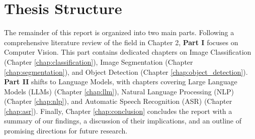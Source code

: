\documentclass[../main.tex]{subfiles}
\begin{document}
\section{Thesis Structure}
\label{sec:thesis_structure}

The remainder of this report is organized into two main parts. Following a comprehensive literature review of the field in Chapter 2, \textbf{Part I} focuses on Computer Vision. This part contains dedicated chapters on Image Classification (Chapter \ref{chap:classification}), Image Segmentation (Chapter \ref{chap:segmentation}), and Object Detection (Chapter \ref{chap:object_detection}). \textbf{Part II} shifts to Language Models, with chapters covering Large Language Models (LLMs) (Chapter \ref{chap:llm}), Natural Language Processing (NLP) (Chapter \ref{chap:nlp}), and Automatic Speech Recognition (ASR) (Chapter \ref{chap:asr}). Finally, Chapter \ref{chap:conclusion} concludes the report with a summary of our findings, a discussion of their implications, and an outline of promising directions for future research.
\end{document}
